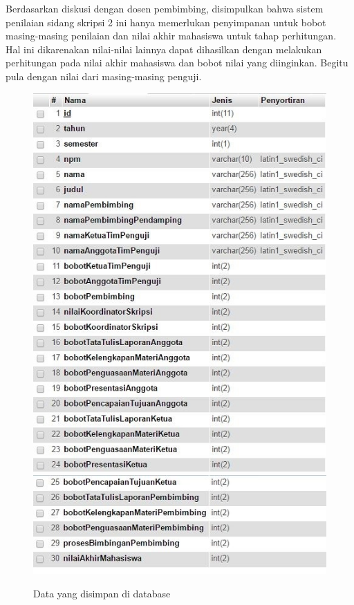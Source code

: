 	Berdasarkan diskusi dengan dosen pembimbing, disimpulkan bahwa sistem penilaian sidang skripsi 2 ini hanya memerlukan penyimpanan untuk bobot masing-masing penilaian dan nilai akhir mahasiswa untuk tahap perhitungan. Hal ini dikarenakan nilai-nilai lainnya dapat dihasilkan dengan melakukan perhitungan pada  nilai akhir mahasiswa dan bobot nilai yang diinginkan. Begitu pula dengan nilai dari masing-masing penguji.
	
		\begin{figure}[H]
			\centering
			\includegraphics[scale= 1.0]{Gambar/database1}
			\includegraphics[scale= 1.0]{Gambar/database2}
			\caption {Data yang disimpan di database}
			\label{fig:tabeldata}
		\end{figure}
	
